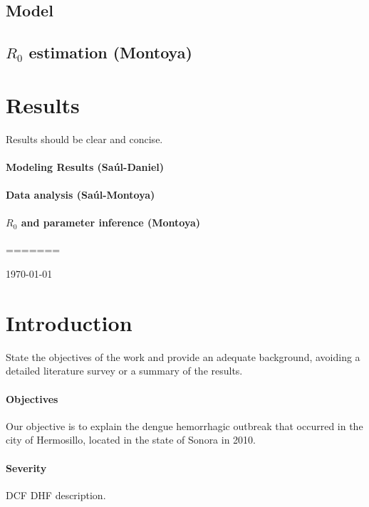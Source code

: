 \documentclass{imammb}
\numberwithin{equation}{section}
\begin{document}
         \subsection*{Model}
             
             
             
         \subsection{$R_0$ estimation (Montoya)}
     \section{Results}
         Results should be clear and concise.
         \paragraph{Modeling Results (Saúl-Daniel)}
         \paragraph{Data analysis (Saúl-Montoya)}
         \paragraph{$R_0$ and parameter inference (Montoya)}
=======
	\begin{frontmatter}
		
	\end{frontmatter}
	\today
    \section{Introduction} \label{intro}
		State the objectives of the work and provide an adequate 
		background, avoiding a detailed literature survey or a 
		summary of the results.

		\paragraph{Objectives}
        Our objective is to explain the dengue hemorrhagic outbreak that 
     occurred in the city of Hermosillo, located in the state of Sonora in 2010.
    \paragraph{Severity}
    \ac{DCF} 
    \ac{DHF} description.
\end{document}
